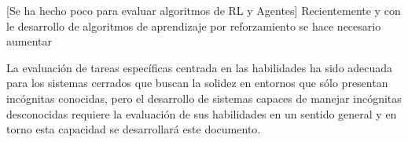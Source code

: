[Se ha hecho poco para evaluar algoritmos de RL y Agentes]
Recientemente y con le desarrollo de algoritmos de aprendizaje por reforzamiento se hace necesario aumentar 



La evaluación de tareas específicas centrada en las habilidades ha sido adecuada para los sistemas cerrados que buscan la solidez en entornos que sólo presentan incógnitas conocidas, pero el desarrollo de sistemas capaces de manejar incógnitas desconocidas requiere la evaluación de sus habilidades en un sentido general y en torno esta capacidad se desarrollará este documento.










